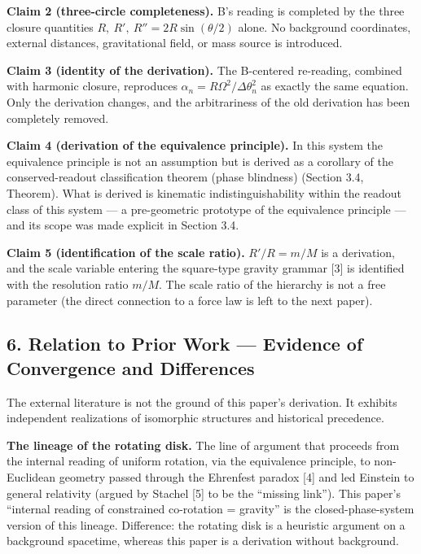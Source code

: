\documentclass[
  a4paper,
]{article}
\begin{document}
\textbf{Claim 2 (three-circle completeness).} B's reading is completed
by the three closure quantities \(R,\ R',\ R''=2R\sin(\theta/2)\) alone.
No background coordinates, external distances, gravitational field, or
mass source is introduced.

\textbf{Claim 3 (identity of the derivation).} The B-centered
re-reading, combined with harmonic closure, reproduces
\(\alpha_n=R\Omega^2/\Delta\theta_n^2\) as exactly the same equation.
Only the derivation changes, and the arbitrariness of the old derivation
has been completely removed.

\textbf{Claim 4 (derivation of the equivalence principle).} In this
system the equivalence principle is not an assumption but is derived as
a corollary of the conserved-readout classification theorem (phase
blindness) (Section 3.4, Theorem). What is derived is kinematic
indistinguishability within the readout class of this system --- a
pre-geometric prototype of the equivalence principle --- and its scope
was made explicit in Section 3.4.

\textbf{Claim 5 (identification of the scale ratio).} \(R'/R=m/M\) is a
derivation, and the scale variable entering the square-type gravity
grammar {[}3{]} is identified with the resolution ratio \(m/M\). The
scale ratio of the hierarchy is not a free parameter (the direct
connection to a force law is left to the next paper).

\subsection{6. Relation to Prior Work --- Evidence of Convergence and
Differences}\label{relation-to-prior-work-evidence-of-convergence-and-differences}

The external literature is not the ground of this paper's derivation. It
exhibits independent realizations of isomorphic structures and
historical precedence.

\textbf{The lineage of the rotating disk.} The line of argument that
proceeds from the internal reading of uniform rotation, via the
equivalence principle, to non-Euclidean geometry passed through the
Ehrenfest paradox {[}4{]} and led Einstein to general relativity (argued
by Stachel {[}5{]} to be the ``missing link''). This paper's ``internal
reading of constrained co-rotation = gravity'' is the
closed-phase-system version of this lineage. Difference: the rotating
disk is a heuristic argument on a background spacetime, whereas this
paper is a derivation without background.
\end{document}
